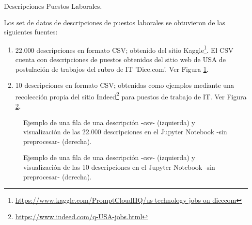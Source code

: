\documentclass[12pt,a4paper]{article}
\makeatletter
\renewcommand\paragraph{\@startsection{paragraph}{4}{\z@}
            {-2.5ex\@plus -1ex \@minus -.25ex}
            {1.25ex \@plus .25ex}
            {\normalfont\normalsize\bfseries}}
\makeatother
\begin{document}
\begin{sloppypar}
\cleardoublepage

\paragraph{Descripciones Puestos Laborales.}\label{puestos_lab}

Los set de datos de descripciones de puestos laborales se obtuvieron de las siguientes fuentes:

\begin{enumerate}
\item 22.000 descripciones en formato CSV; obtenido del sitio Kaggle\footnote{\url{https://www.kaggle.com/PromptCloudHQ/us-technology-jobs-on-dicecom}}. El CSV cuenta con descripciones de puestos obtenidos del sitio web de USA de postulación de trabajos del rubro de IT 'Dice.com'. Ver Figura \ref{fig:DS_Job_1}.
\item 10 descripciones en formato CSV; obtenidas como ejemplos mediante una recolección propia del sitio Indeed\footnote{\url{https://www.indeed.com/q-USA-jobs.html}} para puestos de trabajo de IT. Ver Figura \ref{fig:DS_Job_2}.
\end{enumerate}

\begin{figure}[H] 
 \centering
 \noindent{}
 \caption{Ejemplo de una fila de una descripción -csv- (izquierda) y visualización de las 22.000 descripciones en el Jupyter Notebook -sin preprocesar- (derecha).} 
 \label{fig:DS_Job_1}
\end{figure}

\begin{figure}[H] 
 \centering
 \noindent{}
 \caption{Ejemplo de una fila de una descripción -csv- (izquierda) y visualización de las 10 descripciones en el Jupyter Notebook -sin preprocesar- (derecha).} 
 \label{fig:DS_Job_2}
\end{figure}


\end{sloppypar}
\end{document}
